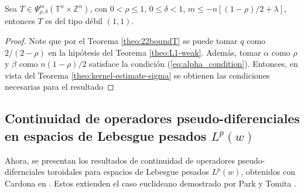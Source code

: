 \begin{theorem}
	Sea $T \in \Psi^m_{\rho, \delta}(\mathbb{T}^n \times \mathbb{Z}^n) $, con $0 < \rho \leq 1$, $0 \leq \delta < 1$, $m \leq - n [(1-\rho)/2 + \lambda] $, entonces $T$ es del tipo débil $(1, 1)$.
\end{theorem}
\begin{proof}
	Note que por el Teorema \ref{theo:22boundT} se puede tomar $q$ como $2/(2-\rho)$ en la hipótesis del Teorema \ref{theo:L1-weak}. Además, tomar $\alpha$ como $\rho$ y $\beta$ como $n(1-\rho)/2$ satisface la condición  (\ref{eq:alpha_condition}). Entonces, en vista del Teorema \ref{theo:kernel-estimate-sigma} se obtienen las condiciones necesarias para el resultado
\end{proof}
\subsection{Continuidad de operadores pseudo-diferenciales en espacios de Lebesgue pesados $L^p(w)$}
Ahora, se presentan los resultados de continuidad de operadores pseudo-difernciales toroidales para espacios de Lebesgue pesados $L^p(w)$, obtenidos con Cardona en \cite{cardona-martinez-III}. Estos extienden el caso euclideano demostrado por Park y Tomita \cite{park-tomita}.

